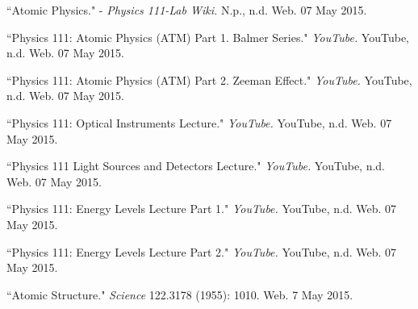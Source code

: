 \begin{thebibliography}{9}

  ``Atomic Physics." - \emph{Physics 111-Lab Wiki.} N.p., n.d. Web. 07 May 2015.

  ``Physics 111: Atomic Physics (ATM) Part 1. Balmer Series." \emph{YouTube.} YouTube, n.d. Web. 07 May 2015.

  ``Physics 111: Atomic Physics (ATM) Part 2. Zeeman Effect." \emph{YouTube.} YouTube, n.d. Web. 07 May 2015.

  ``Physics 111: Optical Instruments Lecture." \emph{YouTube.} YouTube, n.d. Web. 07 May 2015.

``Physics 111 Light Sources and Detectors Lecture." \emph{YouTube.} YouTube, n.d. Web. 07 May 2015.

``Physics 111: Energy Levels Lecture Part 1." \emph{YouTube.} YouTube, n.d. Web. 07 May 2015.

``Physics 111: Energy Levels Lecture Part 2." \emph{YouTube.} YouTube, n.d. Web. 07 May 2015.

``Atomic Structure." \emph{Science} 122.3178 (1955): 1010. Web. 7 May 2015.

\end{thebibliography}



